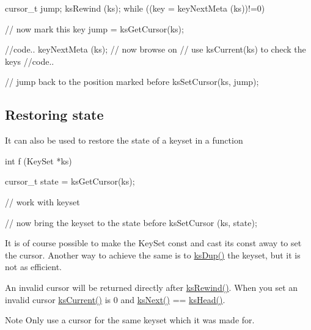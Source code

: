 \begin{DoxyCode}
cursor_t jump;
ksRewind (ks);
while ((key = keyNextMeta (ks))!=0)
{
        // now mark this key
        jump = ksGetCursor(ks);

        //code..
        keyNextMeta (ks); // now browse on
        // use ksCurrent(ks) to check the keys
        //code..

        // jump back to the position marked before
        ksSetCursor(ks, jump);
}
\end{DoxyCode}
\hypertarget{group__keyset_restore}{}\subsection{Restoring state}\label{group__keyset_restore}
It can also be used to restore the state of a keyset in a function


\begin{DoxyCode}
int f (KeySet *ks)
{
        cursor_t state = ksGetCursor(ks);

        // work with keyset

        // now bring the keyset to the state before
        ksSetCursor (ks, state);
}
\end{DoxyCode}


It is of course possible to make the KeySet const and cast its const away to set the cursor. Another way to achieve the same is to \hyperlink{group__keyset_gac59e4b328245463f1451f68d5106151c}{ksDup()} the keyset, but it is not as efficient.

An invalid cursor will be returned directly after \hyperlink{group__keyset_gabe793ff51f1728e3429c84a8a9086b70}{ksRewind()}. When you set an invalid cursor \hyperlink{group__keyset_ga4287b9416912c5f2ab9c195cb74fb094}{ksCurrent()} is 0 and \hyperlink{group__keyset_ga317321c9065b5a4b3e33fe1c399bcec9}{ksNext()} == \hyperlink{group__keyset_gae7dbf3aef70e67b5328475eb3d1f92f5}{ksHead()}.

\begin{DoxyNote}{Note}
Only use a cursor for the same keyset which it was made for.
\end{DoxyNote}

